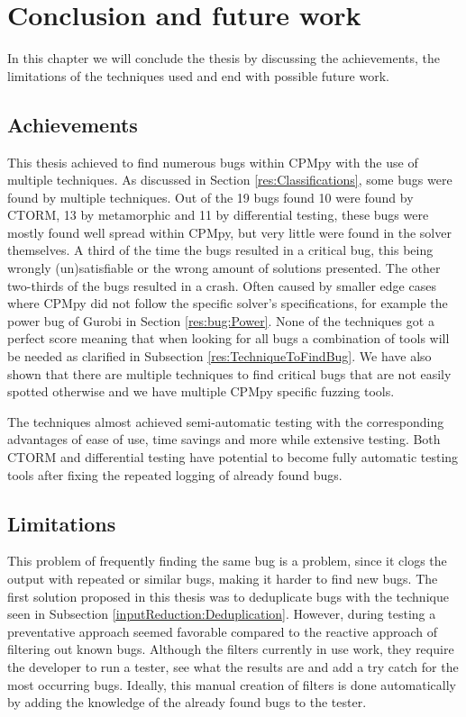 \chapter{Conclusion and future work}
\label{cha:7:conclusion}
\label{con:intro}
In this chapter we will conclude the thesis by discussing the achievements, the limitations of the techniques used and end with possible future work.

\section{Achievements}
\label{con:Achievements}
This thesis achieved to find numerous bugs within CPMpy with the use of multiple techniques. As discussed in Section \ref{res:Classifications}, some bugs were found by multiple techniques. Out of the 19 bugs found 10 were found by CTORM, 13 by metamorphic and 11 by differential testing, these bugs were mostly found well spread within CPMpy, but very little were found in the solver themselves. A third of the time the bugs resulted in a critical bug, this being wrongly (un)satisfiable or the wrong amount of solutions presented. The other two-thirds of the bugs resulted in a crash. Often caused by smaller edge cases where CPMpy did not follow the specific solver’s specifications, for example the power bug of Gurobi in Section \ref{res:bug:Power}. None of the techniques got a perfect score meaning that when looking for all bugs a combination of tools will be needed as clarified in Subsection \ref{res:TechniqueToFindBug}. We have also shown that there are multiple techniques to find critical bugs that are not easily spotted otherwise and we have multiple CPMpy specific fuzzing tools.

The techniques almost achieved semi-automatic testing with the corresponding advantages of ease of use, time savings and more while extensive testing. Both CTORM and differential testing have potential to become fully automatic testing tools after fixing the repeated logging of already found bugs.


\section{Limitations}
\label{con:Limitations}
This problem of frequently finding the same bug is a problem, since it clogs the output with repeated or similar bugs, making it harder to find new bugs. The first solution proposed in this thesis was to deduplicate bugs with the technique seen in Subsection \ref{inputReduction:Deduplication}. However, during testing a preventative approach seemed favorable compared to the reactive approach of filtering out known bugs. Although the filters currently in use work, they require the developer to run a tester, see what the results are and add a try catch for the most occurring bugs. Ideally, this manual creation of filters is done automatically by adding the knowledge of the already found bugs to the tester. 

